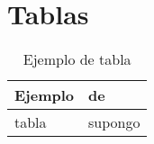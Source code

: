 \chapter{Tablas}

\begin{table}
\caption{Ejemplo de tabla}
\label{arm:table}
\begin{center}
\begin{tabular}{||l|l||}\hline
Ejemplo & de \\\hline
tabla	   & supongo \\\hline
\end{tabular}
\end{center}
\end{table}

\clearpage
\newpage
